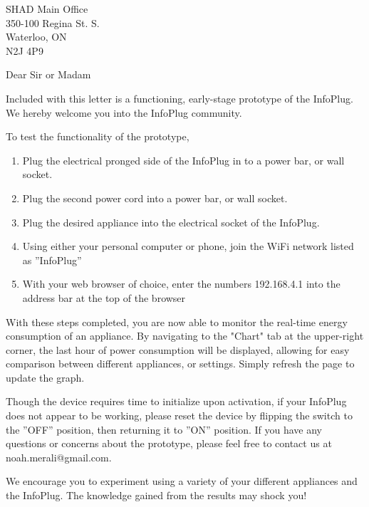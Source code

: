 \documentclass[]{letter}
\begin{document}
	\signature{InfoPlug Ltd.}
	\address{Memorial University of Newfoundland \\ St. Johns,  NL\\A1B 3X9}
	\begin{letter}{SHAD Main Office \\ 350-100 Regina St. S. \\ Waterloo, ON \\ N2J 4P9}
		\opening{Dear Sir or Madam}
		
		Included with this letter is a functioning, early-stage prototype of the InfoPlug. We hereby welcome you into the InfoPlug community.
		
		To test the functionality of the prototype,

		 \begin{enumerate}
		 	\item Plug the electrical pronged side of the InfoPlug in to a power bar, or wall socket.
		 	\item Plug the second power cord into a power bar, or wall socket.
		 	\item Plug the desired appliance into the electrical socket of the InfoPlug.
		 	\item Using either your personal computer or phone, join the WiFi network listed as ”InfoPlug”
		 	\item With your web browser of choice, enter the numbers 192.168.4.1 into the address bar at the top of the browser
		 \end{enumerate}
		
		With these steps completed, you are now able to monitor the real-time energy consumption of an appliance. By navigating to the "Chart" tab at the upper-right corner, the last hour of power consumption will be displayed, allowing for easy comparison between different appliances, or settings. Simply refresh the page to update the graph. 
		
		
		Though the device requires time to initialize upon activation, if your InfoPlug does not appear to be working, please reset the device by flipping the switch to the ”OFF” position, then returning it to ”ON” position. If you have any questions or concerns about the prototype, please feel free to contact us at noah.merali@gmail.com. 
		
		We encourage you to experiment using a variety of your different appliances and the InfoPlug. The knowledge gained from the results may shock you!
		

\end{letter}
\end{document}
